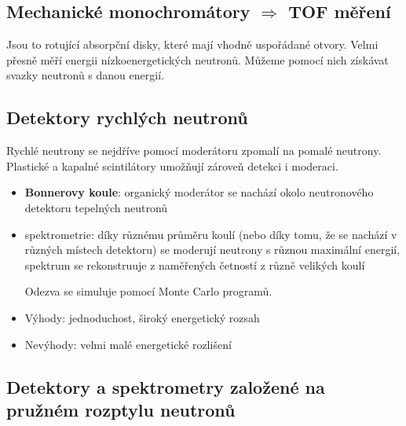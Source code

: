 \documentclass[../../main.tex]{subfiles}
\begin{document}
\subsection{Mechanické monochromátory $\Rightarrow$ TOF měření}

Jsou to rotující absorpční disky, které mají vhodně uspořádané otvory. Velmi přesně měří energii nízkoenergetických neutronů. Můžeme pomocí nich získávat svazky neutronů s danou energií.

\subsection{Detektory rychlých neutronů}

Rychlé neutrony se nejdříve pomocí moderátoru zpomalí na pomalé neutrony. Plastické a kapalné scintilátory umožňují zároveň detekci i moderaci. 

\begin{itemize}
	\item \textbf{Bonnerovy koule}: organický moderátor se nachází okolo neutronového detektoru tepelných neutronů
	\item spektrometrie: díky různému průměru koulí (nebo díky tomu, že se nachází v různých místech detektoru) se moderují neutrony s různou maximální energií, spektrum se rekonstruuje z naměřených četností z různě velikých koulí
	
	Odezva se simuluje pomocí Monte Carlo programů.
	
	\item Výhody: jednoduchost, široký energetický rozsah
	\item Nevýhody: velmi malé energetické rozlišení
\end{itemize}

\subsection{Detektory a spektrometry založené na pružném rozptylu neutronů}
\end{document}
